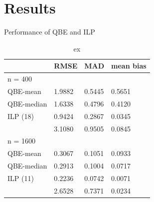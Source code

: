 \documentclass{beamer}
\begin{document}
\section{Results}
\begin{frame}{Performance of QBE and ILP}
    \begin{table}
        \centering
        \begin{tabular}{llll}
          \hline
                     & RMSE   & MAD    & mean bias \\ \hline
          n = 400    &        &        &  \\
          QBE-mean   & 1.9882 & 0.5445 & 0.5651    \\
          QBE-median & 1.6338 & 0.4796 & 0.4120    \\
          ILP (18)   & 0.9424 & 0.2867 & 0.0345    \\
                     & 3.1080 & 0.9505 & 0.0845    \\ \hline
          n = 1600   &        &        &  \\
          QBE-mean   & 0.3067 & 0.1051 & 0.0933    \\
          QBE-median & 0.2913 & 0.1004 & 0.0717    \\
          ILP (11)   & 0.2236 & 0.0742 & 0.0071    \\
                     & 2.6528 & 0.7371 & 0.0234    \\ \hline
        \end{tabular}
        \caption{ex}
    \end{table}
\end{frame}
\end{document}
